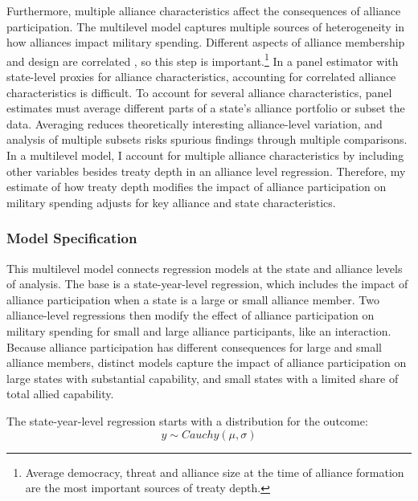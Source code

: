 \documentclass[12pt]{article}
\begin{document}
Furthermore, multiple alliance characteristics affect the consequences of alliance participation.
The multilevel model captures multiple sources of heterogeneity in how alliances impact military spending. 
Different aspects of alliance membership and design are correlated \citep{Chibaetal2015}, so this step is important.\footnote{Average democracy, threat and alliance size at the time of alliance formation are the most important sources of treaty depth.} 
In a panel estimator with state-level proxies for alliance characteristics, accounting for correlated alliance characteristics is difficult. 
To account for several alliance characteristics, panel estimates must average different parts of a state's alliance portfolio or subset the data.
Averaging reduces theoretically interesting alliance-level variation, and analysis of multiple subsets risks spurious findings through multiple comparisons.  
In a multilevel model, I account for multiple alliance characteristics by including other variables besides treaty depth in an alliance level regression. 
Therefore, my estimate of how treaty depth modifies the impact of alliance participation on military spending adjusts for key alliance and state characteristics. 
 


\subsubsection{Model Specification} 

This multilevel model connects regression models at the state and alliance levels of analysis. 
The base is a state-year-level regression, which includes the impact of alliance participation when a state is a large or small alliance member.
Two alliance-level regressions then modify the effect of alliance participation on military spending for small and large alliance participants, like an interaction. 
Because alliance participation has different consequences for large and small alliance members, distinct models capture the impact of alliance participation on large states with substantial capability, and small states with a limited share of total allied capability. 


The state-year-level regression starts with a distribution for the outcome:
\begin{equation}
y \sim Cauchy(\mu, \sigma)
\end{equation}
 
\end{document}
